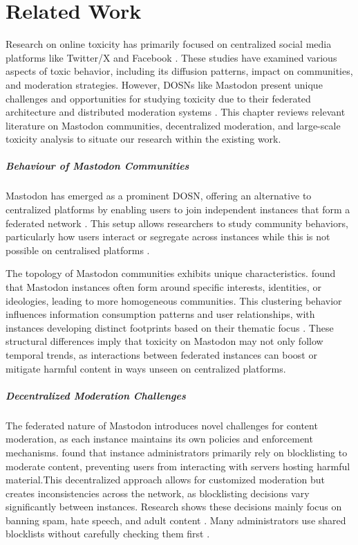 \chapter{Related Work}

Research on online toxicity has primarily focused on centralized social media platforms like Twitter/X and Facebook \cite{fan:2022,nicholson:2023}. These studies have examined various aspects of toxic behavior, including its diffusion patterns, impact on communities, and moderation strategies. However, DOSNs like Mastodon present unique challenges and opportunities for studying toxicity due to their federated architecture and distributed moderation systems \cite{bono:2024}. This chapter reviews relevant literature on Mastodon communities, decentralized moderation, and large-scale toxicity analysis to situate our research within the existing work.

\paragraph{Behaviour of Mastodon Communities}
Mastodon has emerged as a prominent DOSN, offering an alternative to centralized platforms by enabling users to join independent instances that form a federated network \cite{zulli:2020}. This setup allows researchers to study community behaviors, particularly how users interact or segregate across instances while this is not possible on centralised platforms \cite{zignani:2018,zulli:2020}.

The topology of Mastodon communities exhibits unique characteristics. \citet{zulli:2020} found that Mastodon instances often form around specific interests, identities, or ideologies, leading to more homogeneous communities. This clustering behavior influences information consumption patterns and user relationships, with instances developing distinct footprints based on their thematic focus \cite{la_cava:2021}. These structural differences imply that toxicity on Mastodon may not only follow temporal trends, as interactions between federated instances can boost or mitigate harmful content in ways unseen on centralized platforms.

\paragraph{Decentralized Moderation Challenges}
The federated nature of Mastodon introduces novel challenges for content moderation, as each instance maintains its own policies and enforcement mechanisms. \citet{bono:2024} found that instance administrators primarily rely on blocklisting to moderate content, preventing users from interacting with servers hosting harmful material.This decentralized approach allows for customized moderation but creates inconsistencies across the network, as blocklisting decisions vary significantly between instances. Research shows these decisions mainly focus on banning spam, hate speech, and adult content \citep{nicholson:2023}. Many administrators use shared blocklists without carefully checking them first \cite{bono:2024}.

